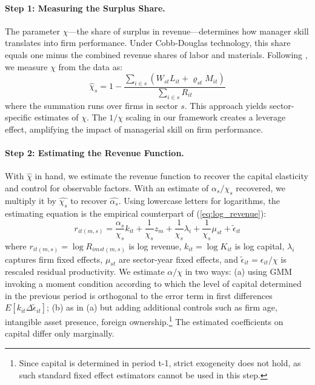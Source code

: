 \documentclass[11pt,a4paper]{article}
\begin{document}
\paragraph{Step 1: Measuring the Surplus Share.} The parameter $\chi$---the share of surplus in revenue---determines how manager skill translates into firm performance. Under Cobb-Douglas technology, this share equals one minus the combined revenue shares of labor and materials. Following \citet{Gandhi2020-nu}, we measure $\chi$ from the data as:
\begin{equation}
\hat{\chi}_s = 1 - \frac{\sum_{i \in s}(W_{st}L_{it} + \varrho_{st}M_{it})}{\sum_{i \in s} R_{it}}
\end{equation}
where the summation runs over firms in sector $s$. This approach yields sector-specific estimates of $\chi$. The $1/\chi$ scaling in our framework creates a leverage effect, amplifying the impact of managerial skill on firm performance.

\paragraph{Step 2: Estimating the Revenue Function.} With $\hat{\chi}$ in hand, we estimate the revenue function to recover the capital elasticity and control for observable factors. With an estimate of $\alpha_s/\chi_s$ recovered, we multiply it by $\hat{\chi_s}$ to recover $\hat{\alpha_s}$. Using lowercase letters for logarithms, the estimating equation is the empirical counterpart of (\ref{eq:log_revenue}):
\begin{equation}
r_{it(m,s)} = \frac{\alpha_s}{\chi_s} k_{it} + \frac{1}{\chi_s}z_m + \frac{1}{\chi_s} \lambda_i + \frac{1}{\chi_s} \mu_{st} + \tilde{\epsilon}_{it}
\end{equation}
where $r_{it(m,s)} = \log R_{imst(m,s)}$ is log revenue, $k_{it} = \log K_{it}$ is log capital, $\lambda_i$ captures firm fixed effects, $\mu_{st}$ are sector-year fixed effects, and $\tilde{\epsilon}_{it} = \epsilon_{it}/\chi$ is rescaled residual productivity. We estimate $\alpha/\chi$ in two ways: (a)  using GMM invoking a moment condition according to which the level of capital determined in the previous period is orthogonal to the error term in first differences  $E[k_{it} \Delta \tilde{\epsilon}_{it}]$; (b) as in (a) but adding additional controls such as firm age, intangible asset presence, foreign ownership.\footnote{Since capital is determined in period t-1, strict exogeneity does not hold, as such standard fixed effect estimators cannot be used in this step.} The estimated coefficients on capital differ only marginally.
\end{document}
